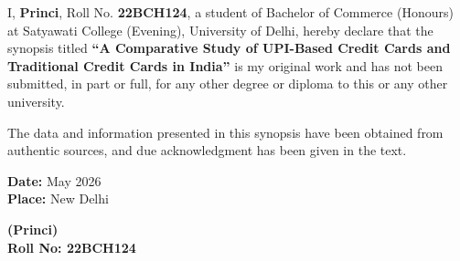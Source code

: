 
I, \textbf{Princi}, Roll No. \textbf{22BCH124}, a student of Bachelor of Commerce (Honours) at Satyawati College (Evening), University of Delhi, hereby declare that the synopsis titled \textbf{``A Comparative Study of UPI-Based Credit
Cards and Traditional Credit Cards in India''} is my original work and has not been submitted, in part or full, for any other degree or diploma to this or any other university.

The data and information presented in this synopsis have been obtained from authentic sources, and due acknowledgment has been given in the text.

\vspace{2cm}

\noindent
\textbf{Date:} May 2026 \\
\textbf{Place:} New Delhi

\vspace{2cm}

\noindent
\textbf{(Princi)} \\
\textbf{Roll No: 22BCH124}
